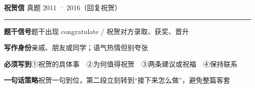 \documentclass[11pt,a4paper]{ctexart}
\begin{document}
\clearpage
{}\label{g06}
\noindent{\color{accent}\rule{\linewidth}{1.5pt}}\par\vspace{3pt}
\hspace{6pt}
{\LARGE\bfseries 祝贺信}\hfill
{\footnotesize\color{gray} 真题 2011 · 2016（回复祝贺）}\par
\vspace{1pt}
{\color{accent!35}\rule{\linewidth}{0.5pt}}\par\vspace{3pt}
{\footnotesize {\color{accent}\bfseries 题干信号}\quad 题干出现 congratulate / 祝贺对方录取、获奖、晋升}\par
{\footnotesize {\color{accent}\bfseries 写作身份}\quad 亲戚、朋友或同学；语气热情但别夸张}\par
{\footnotesize {\color{accent}\bfseries 必须写到}\quad ①祝贺的具体事　②为何值得祝贺　③两条建议或祝福　④保持联系}\par
{\footnotesize {\color{accent}\bfseries 一句话策略}\quad 祝贺一句到位，第二段立刻转到“接下来怎么做”，避免整篇客套}\par
\end{document}
